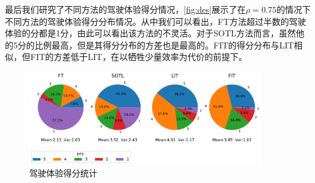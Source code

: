 最后我们研究了不同方法的驾驶体验得分情况，\autoref{fig:des}展示了在$\rho=0.75$的情况下不同方法的驾驶体验得分分布情况。从中我们可以看出，FT方法超过半数的驾驶体验的分都是1分，由此可以看出该方法的不灵活。对于SOTL方法而言，虽然他的5分的比例最高，但是其得分分布的方差也是最高的。FIT的得分分布与LIT相似，但FIT的方差低于LIT，在以牺牲少量效率为代价的前提下。

\begin{figure}[t]
    \centering
    \includegraphics[width=0.9\textwidth]{fig/des.pdf}
    \caption{驾驶体验得分统计}
    \label{fig:des}
\end{figure}



